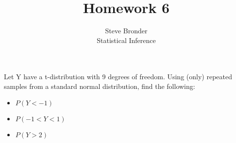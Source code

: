 \documentclass[12pt]{article}\usepackage[]{graphicx}\usepackage[]{color}
\newenvironment{exercise}[2][Exercise]{\begin{trivlist}
\item[\hskip \labelsep {\bfseries #1}\hskip \labelsep {\bfseries #2.}]}{\end{trivlist}}
\begin{document}
 
 
\title{Homework 6}%
\author{Steve Bronder\\ %
Statistical Inference} %
 
\maketitle
 
\begin{exercise}{1}Let Y have a t-distribution with 9 degrees of freedom. Using (only) repeated samples from a standard normal distribution, find the following:

\begin{itemize}
  \item $P(Y<-1)$
    \item $P(-1<Y<1)$
      \item $P(Y>2)$
\end{itemize}
\end{exercise}
\end{document}
